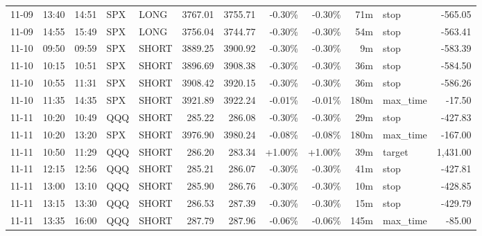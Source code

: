\documentclass[11pt,a4paper]{article}
\begin{document}
\begin{center}
\begin{longtable}{>{\color{txtmain}}l l l l l r r r r r >{\color{txtmain}}l r}
11-09 & 13:40 & 14:51 & SPX & LONG & 3767.01 & 3755.71 & \textcolor{lossred}{-0.30\%} & \textcolor{lossred}{-0.30\%} & 71m & stop & \textcolor{lossred}{-565.05} \\
11-09 & 14:55 & 15:49 & SPX & LONG & 3756.04 & 3744.77 & \textcolor{lossred}{-0.30\%} & \textcolor{lossred}{-0.30\%} & 54m & stop & \textcolor{lossred}{-563.41} \\
11-10 & 09:50 & 09:59 & SPX & SHORT & 3889.25 & 3900.92 & \textcolor{lossred}{-0.30\%} & \textcolor{lossred}{-0.30\%} & 9m & stop & \textcolor{lossred}{-583.39} \\
11-10 & 10:15 & 10:51 & SPX & SHORT & 3896.69 & 3908.38 & \textcolor{lossred}{-0.30\%} & \textcolor{lossred}{-0.30\%} & 36m & stop & \textcolor{lossred}{-584.50} \\
11-10 & 10:55 & 11:31 & SPX & SHORT & 3908.42 & 3920.15 & \textcolor{lossred}{-0.30\%} & \textcolor{lossred}{-0.30\%} & 36m & stop & \textcolor{lossred}{-586.26} \\
11-10 & 11:35 & 14:35 & SPX & SHORT & 3921.89 & 3922.24 & \textcolor{lossred}{-0.01\%} & \textcolor{lossred}{-0.01\%} & 180m & max\_time & \textcolor{lossred}{-17.50} \\
11-11 & 10:20 & 10:49 & QQQ & SHORT & 285.22 & 286.08 & \textcolor{lossred}{-0.30\%} & \textcolor{lossred}{-0.30\%} & 29m & stop & \textcolor{lossred}{-427.83} \\
11-11 & 10:20 & 13:20 & SPX & SHORT & 3976.90 & 3980.24 & \textcolor{lossred}{-0.08\%} & \textcolor{lossred}{-0.08\%} & 180m & max\_time & \textcolor{lossred}{-167.00} \\
11-11 & 10:50 & 11:29 & QQQ & SHORT & 286.20 & 283.34 & \textcolor{wingreen}{+1.00\%} & \textcolor{wingreen}{+1.00\%} & 39m & target & \textcolor{wingreen}{1,431.00} \\
11-11 & 12:15 & 12:56 & QQQ & SHORT & 285.21 & 286.07 & \textcolor{lossred}{-0.30\%} & \textcolor{lossred}{-0.30\%} & 41m & stop & \textcolor{lossred}{-427.81} \\
11-11 & 13:00 & 13:10 & QQQ & SHORT & 285.90 & 286.76 & \textcolor{lossred}{-0.30\%} & \textcolor{lossred}{-0.30\%} & 10m & stop & \textcolor{lossred}{-428.85} \\
11-11 & 13:15 & 13:30 & QQQ & SHORT & 286.53 & 287.39 & \textcolor{lossred}{-0.30\%} & \textcolor{lossred}{-0.30\%} & 15m & stop & \textcolor{lossred}{-429.79} \\
11-11 & 13:35 & 16:00 & QQQ & SHORT & 287.79 & 287.96 & \textcolor{lossred}{-0.06\%} & \textcolor{lossred}{-0.06\%} & 145m & max\_time & \textcolor{lossred}{-85.00} \\

\end{longtable}
\end{center}
\end{document}
